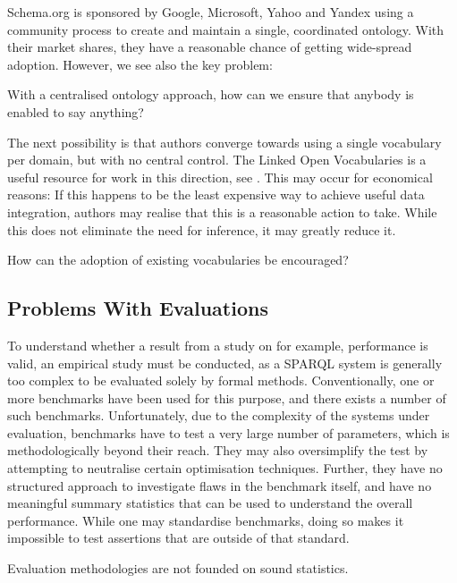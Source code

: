 Schema.org is sponsored by Google, Microsoft, Yahoo and Yandex using a
community process to create and maintain a single, coordinated
ontology. With their market shares, they have a reasonable chance of
getting wide-spread adoption. However, we see also the key problem:

\begin{problem}\label{prob:sayanything}
With a centralised ontology approach, how can we ensure that anybody is enabled to say
anything?
\end{problem}

The next possibility is that authors converge towards using a single
vocabulary per domain, but with no central control. The Linked Open
Vocabularies is a useful resource for work in this direction, see
\cite{lov2}. This may occur for economical reasons: If this happens to
be the least expensive way to achieve useful data integration, authors
may realise that this is a reasonable action to take. While this does
not eliminate the need for inference, it may greatly reduce it.

\begin{problem}\label{prob:useexist}
How can the adoption of existing vocabularies be encouraged? 
\end{problem}


\subsection{Problems With Evaluations}\label{sec:evalproblems}

To understand whether a result from a study on for example,
performance is valid, an empirical study must be conducted, as a
SPARQL system is generally too complex to be evaluated solely by
formal methods. Conventionally, one or more benchmarks have been used
for this purpose, and there exists a number of such
benchmarks. Unfortunately, due to the complexity of the systems under
evaluation, benchmarks have to test a very large number of parameters,
which is methodologically beyond their reach. They may also
oversimplify the test by attempting to neutralise certain optimisation
techniques. Further, they have no structured approach to investigate
flaws in the benchmark itself, and have no meaningful summary
statistics that can be used to understand the overall
performance. While one may standardise benchmarks, doing so makes it
impossible to test assertions that are outside of that standard.

\begin{problem}\label{prob:badstats}
Evaluation methodologies are not founded on sound statistics.
\end{problem}


